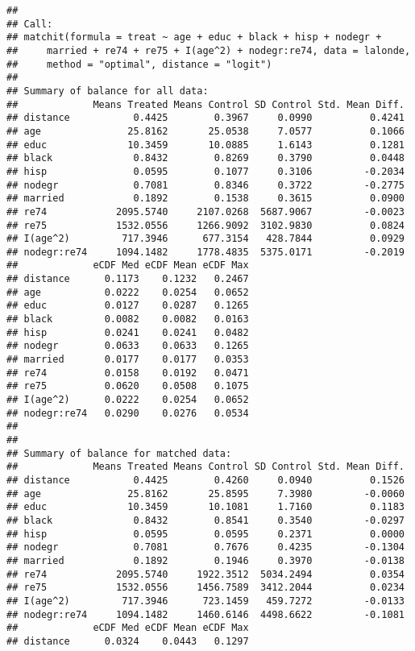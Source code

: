 \documentclass[]{article}
\begin{document}
\begin{verbatim}
## 
## Call:
## matchit(formula = treat ~ age + educ + black + hisp + nodegr + 
##     married + re74 + re75 + I(age^2) + nodegr:re74, data = lalonde, 
##     method = "optimal", distance = "logit")
## 
## Summary of balance for all data:
##             Means Treated Means Control SD Control Std. Mean Diff.
## distance           0.4425        0.3967     0.0990          0.4241
## age               25.8162       25.0538     7.0577          0.1066
## educ              10.3459       10.0885     1.6143          0.1281
## black              0.8432        0.8269     0.3790          0.0448
## hisp               0.0595        0.1077     0.3106         -0.2034
## nodegr             0.7081        0.8346     0.3722         -0.2775
## married            0.1892        0.1538     0.3615          0.0900
## re74            2095.5740     2107.0268  5687.9067         -0.0023
## re75            1532.0556     1266.9092  3102.9830          0.0824
## I(age^2)         717.3946      677.3154   428.7844          0.0929
## nodegr:re74     1094.1482     1778.4835  5375.0171         -0.2019
##             eCDF Med eCDF Mean eCDF Max
## distance      0.1173    0.1232   0.2467
## age           0.0222    0.0254   0.0652
## educ          0.0127    0.0287   0.1265
## black         0.0082    0.0082   0.0163
## hisp          0.0241    0.0241   0.0482
## nodegr        0.0633    0.0633   0.1265
## married       0.0177    0.0177   0.0353
## re74          0.0158    0.0192   0.0471
## re75          0.0620    0.0508   0.1075
## I(age^2)      0.0222    0.0254   0.0652
## nodegr:re74   0.0290    0.0276   0.0534
## 
## 
## Summary of balance for matched data:
##             Means Treated Means Control SD Control Std. Mean Diff.
## distance           0.4425        0.4260     0.0940          0.1526
## age               25.8162       25.8595     7.3980         -0.0060
## educ              10.3459       10.1081     1.7160          0.1183
## black              0.8432        0.8541     0.3540         -0.0297
## hisp               0.0595        0.0595     0.2371          0.0000
## nodegr             0.7081        0.7676     0.4235         -0.1304
## married            0.1892        0.1946     0.3970         -0.0138
## re74            2095.5740     1922.3512  5034.2494          0.0354
## re75            1532.0556     1456.7589  3412.2044          0.0234
## I(age^2)         717.3946      723.1459   459.7272         -0.0133
## nodegr:re74     1094.1482     1460.6146  4498.6622         -0.1081
##             eCDF Med eCDF Mean eCDF Max
## distance      0.0324    0.0443   0.1297

\end{verbatim}
\end{document}

